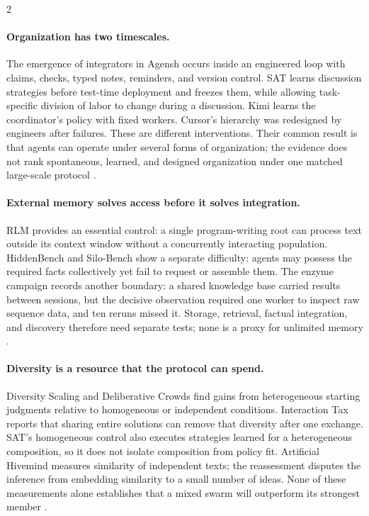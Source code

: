 \begin{multicols}{2}
\paragraph{Organization has two timescales.}
The emergence of integrators in Agensh occurs inside an engineered loop with claims, checks, typed notes, reminders, and version control. SAT learns discussion strategies before test-time deployment and freezes them, while allowing task-specific division of labor to change during a discussion. Kimi learns the coordinator's policy with fixed workers. Cursor's hierarchy was redesigned by engineers after failures. These are different interventions. Their common result is that agents can operate under several forms of organization; the evidence does not rank spontaneous, learned, and designed organization under one matched large-scale protocol \citep{agensh-1024,sat-teams,kimi-agent-swarm,cursor-scaling-long-running,cursor-self-driving}.

\paragraph{External memory solves access before it solves integration.}
RLM provides an essential control: a single program-writing root can process text outside its context window without a concurrently interacting population. HiddenBench and Silo-Bench show a separate difficulty: agents may possess the required facts collectively yet fail to request or assemble them. The enzyme campaign records another boundary: a shared knowledge base carried results between sessions, but the decisive observation required one worker to inspect raw sequence data, and ten reruns missed it. Storage, retrieval, factual integration, and discovery therefore need separate tests; none is a proxy for unlimited memory \citep{recursive-language-models,hiddenbench,silo-bench,anthropic-art-enzymes}.

\paragraph{Diversity is a resource that the protocol can spend.}
Diversity Scaling and Deliberative Crowds find gains from heterogeneous starting judgments relative to homogeneous or independent conditions. Interaction Tax reports that sharing entire solutions can remove that diversity after one exchange. SAT's homogeneous control also executes strategies learned for a heterogeneous composition, so it does not isolate composition from policy fit. Artificial Hivemind measures similarity of independent texts; the reassessment disputes the inference from embedding similarity to a small number of ideas. None of these measurements alone establishes that a mixed swarm will outperform its strongest member \citep{diversity-scaling,deliberative-crowds,interaction-tax,sat-teams,artificial-hivemind}.


\end{multicols}
